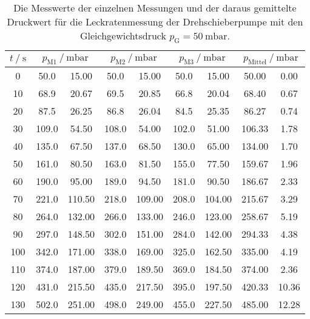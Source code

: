   \begin{table}[h]
    \centering
    \caption{Die Messwerte der einzelnen Messungen und der daraus gemittelte Druckwert für die Leckratenmessung der Drehschieberpumpe mit den 
    Gleichgewichtsdruck $p_\text{G} = \SI{50}{\milli\bar}$.}
    \label{tab:dreh_leck_50}
    \begin{tabular}{S[table-format=3.0] S @{${}\pm{}$} S[table-format=3.2] S @{${}\pm{}$} S[table-format=3.2] S @{${}\pm{}$} S[table-format=3.2] S[table-format=3.2] @{${}\pm{}$} S[table-format=2.2]}
    \toprule
    {$t \mathbin{/} \si{\second} $} &  &  &  &  \\
     &   50.0 &  15.00 &   50.0 &  15.00 &  50.0 &  15.00 &  50.00 &  0.00 \\  
     10 &   68.9 &  20.67 &   69.5 &  20.85 &  66.8 &  20.04 &  68.40 &  0.67 \\
     20 &   87.5 &  26.25 &   86.8 &  26.04 &  84.5 &  25.35 &  86.27 &  0.74 \\
     30 &  109.0 &  54.50 &  108.0 &  54.00 & 102.0 &  51.00 & 106.33 &  1.78 \\
     40 &  135.0 &  67.50 &  137.0 &  68.50 & 130.0 &  65.00 & 134.00 &  1.70 \\
     50 &  161.0 &  80.50 &  163.0 &  81.50 & 155.0 &  77.50 & 159.67 &  1.96 \\
     60 &  190.0 &  95.00 &  189.0 &  94.50 & 181.0 &  90.50 & 186.67 &  2.33 \\
     70 &  221.0 & 110.50 &  218.0 & 109.00 & 208.0 & 104.00 & 215.67 &  3.29 \\
     80 &  264.0 & 132.00 &  266.0 & 133.00 & 246.0 & 123.00 & 258.67 &  5.19 \\
     90 &  297.0 & 148.50 &  302.0 & 151.00 & 284.0 & 142.00 & 294.33 &  4.38 \\
    100 &  342.0 & 171.00 &  338.0 & 169.00 & 325.0 & 162.50 & 335.00 &  4.19 \\
    110 &  374.0 & 187.00 &  379.0 & 189.50 & 369.0 & 184.50 & 374.00 &  2.36 \\
    120 &  431.0 & 215.50 &  435.0 & 217.50 & 395.0 & 197.50 & 420.33 & 10.36 \\
    130 &  502.0 & 251.00 &  498.0 & 249.00 & 455.0 & 227.50 & 485.00 & 12.28 \\

\end{tabular}
\end{table}
